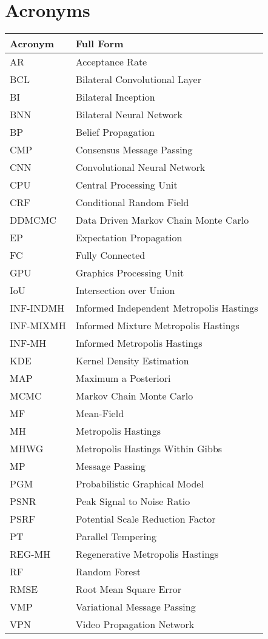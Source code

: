 \chapter{Acronyms}
\label{chap:abbrv}
\vspace{-0.5cm}
\begin{longtable}[l]{p{80pt} p{300pt}}
\toprule
\textbf{Acronym}	& \textbf{Full Form} \\
\midrule
AR & Acceptance Rate \\
BCL	 	& Bilateral Convolutional Layer\\
BI	 	& Bilateral Inception\\
BNN	 	& Bilateral Neural Network\\
BP & Belief Propagation \\
CMP & Consensus Message Passing \\
CNN	 	& Convolutional Neural Network\\
CPU & Central Processing Unit \\
CRF & Conditional Random Field \\
DDMCMC & Data Driven Markov Chain Monte Carlo\\
EP & Expectation Propagation \\
FC & Fully Connected \\
GPU & Graphics Processing Unit \\
IoU & Intersection over Union \\
INF-INDMH	 	& Informed Independent Metropolis Hastings\\
INF-MIXMH	 	& Informed Mixture Metropolis Hastings\\
INF-MH	 	& Informed Metropolis Hastings\\
KDE & Kernel Density Estimation \\
MAP & Maximum a Posteriori \\
MCMC 	& Markov Chain Monte Carlo\\
MF & Mean-Field \\
MH	 	& Metropolis Hastings\\
MHWG & Metropolis Hastings Within Gibbs \\
MP & Message Passing \\
PGM  & Probabilistic Graphical Model \\
PSNR & Peak Signal to Noise Ratio \\
PSRF & Potential Scale Reduction Factor \\
PT & Parallel Tempering \\
REG-MH & Regenerative Metropolis Hastings \\
RF & Random Forest \\
RMSE & Root Mean Square Error \\
VMP & Variational Message Passing \\
VPN & Video Propagation Network \\
\bottomrule
\end{longtable}
